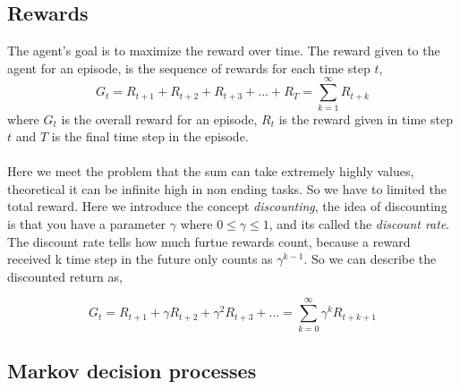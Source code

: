 \documentclass[11pt]{article}
\begin{document}
\subsection{Rewards}

The agent's goal is to maximize the reward over time. The reward given to the agent for an episode, is the sequence of rewards for each time step $t$,
\begin{equation}
    G_{t} = R_{t + 1} + R_{t + 2} + R_{t + 3} + ... + R_{T} = \sum_{k = 1}^{\infty} R_{t + k}
\end{equation}
where $G_{t}$ is the overall reward for an episode, $R_{t}$ is the reward given in time step $t$ and $T$ is the final time step in the episode.
\\ \\
Here we meet the problem that the sum can take extremely highly values, theoretical it can be infinite high in non ending tasks. So we have to limited the total reward. Here we introduce the concept \textit{discounting}, the idea of discounting is that you have a parameter $\gamma$ where $0 \leq \gamma \leq 1$, and its called the \textit{discount rate}. The discount rate tells how much furtue rewards count, because a reward received k time step in the future only counts as $\gamma^{k - 1}$. So we can describe the discounted return as,

\begin{equation}
    G_{t} = R_{t + 1} + \gamma R_{t + 2} + \gamma^{2} R_{t + 3} + ... = \sum_{k = 0}^{\infty} \gamma^{k}R_{t + k + 1}
\end{equation}


\subsection{Markov decision processes}
\end{document}
